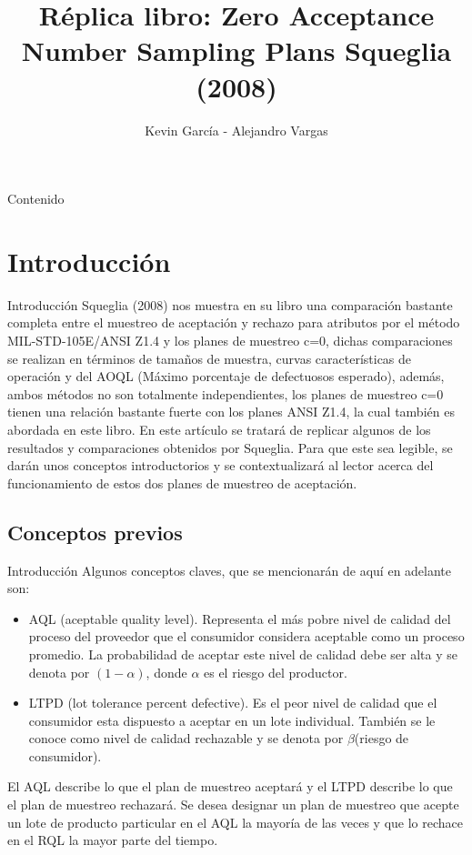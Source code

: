 \documentclass[10pt]{beamer}
\author{Kevin García - Alejandro Vargas}
\title{Réplica libro: Zero Acceptance Number Sampling Plans Squeglia (2008)}
\begin{document}
\begin{frame}[plain]
\maketitle
\end{frame}

\begin{frame}{Contenido}
\tableofcontents
\end{frame}

\section{Introducción}
\begin{frame}{Introducción}
Squeglia (2008)\cite{A0} nos muestra en su libro una comparación bastante completa entre el muestreo de aceptación y rechazo para atributos por el método MIL-STD-105E/ANSI Z1.4 y los planes de muestreo c=0, dichas comparaciones se realizan en términos de tamaños de muestra, curvas características de operación y del AOQL (Máximo porcentaje de defectuosos esperado), además, ambos métodos no son totalmente independientes, los planes de muestreo c=0 tienen una relación bastante fuerte con los planes ANSI Z1.4, la cual también es abordada en este libro. En este artículo se tratará de replicar algunos de los resultados y comparaciones obtenidos por Squeglia. Para que este sea legible, se darán unos conceptos introductorios y se contextualizará al lector acerca del funcionamiento de estos dos planes de muestreo de aceptación.
\end{frame}

\subsection{Conceptos previos}
\begin{frame}{Introducción}
Algunos conceptos claves, que se mencionarán de aquí en adelante son:
\begin{itemize}
\item AQL (aceptable quality level). Representa el más pobre nivel de calidad del proceso del proveedor que el consumidor considera aceptable como un proceso promedio. La probabilidad de aceptar este nivel de calidad debe ser alta y se denota por $(1-\alpha)$, donde $\alpha$ es el riesgo del productor.
\item LTPD (lot tolerance percent defective). Es el peor nivel de calidad que el consumidor esta dispuesto a aceptar en un lote individual. También se le conoce como nivel de calidad rechazable y se denota por $\beta$(riesgo de consumidor).
\end{itemize}
El AQL describe lo que el plan de muestreo aceptará y el LTPD describe lo que el plan de muestreo rechazará. Se desea designar un plan de muestreo que acepte un lote de producto particular en el AQL la mayoría de las veces y que lo rechace en el RQL la mayor parte del tiempo.
\end{frame}
\end{document}
